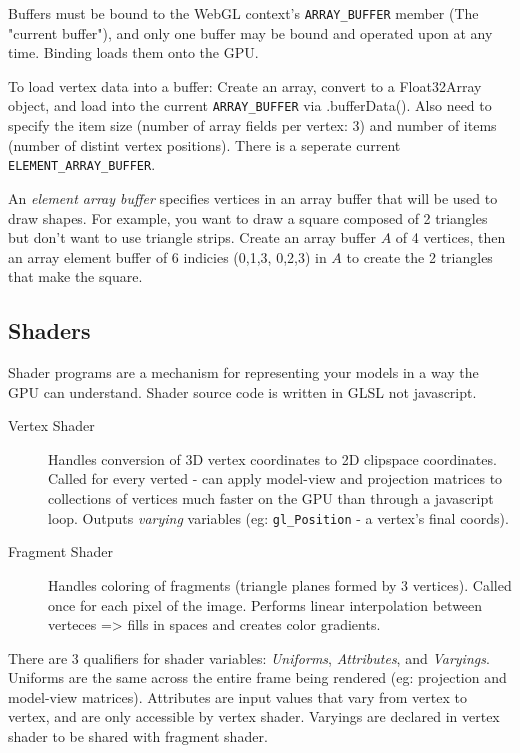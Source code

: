 \documentclass[12pt]{article}
\begin{document}
Buffers must be bound to the WebGL context's  \verb|ARRAY_BUFFER| member (The "current
buffer"), and only one buffer may be bound and operated upon at any time.
Binding loads them onto the GPU. 

To load vertex data into a buffer: Create an array, convert to a Float32Array
object, and load into the current  \verb|ARRAY_BUFFER| via .bufferData(). Also 
need to specify the item size (number of array fields per vertex: 3) and
number of items (number of distint vertex positions). There is a seperate
current  \verb|ELEMENT_ARRAY_BUFFER|.

An \emph{element array buffer} specifies vertices in an array buffer that will
be used to draw shapes. For example, you want to draw a square composed of 2
triangles but don't want to use triangle strips. Create an array buffer $A$ of 4 
vertices, then an array element buffer of 6 indicies (0,1,3, 0,2,3) in $A$ to 
create the 2 triangles that make the square. 

\subsection{Shaders}
Shader programs are a mechanism for representing your models in a way the GPU can
understand. Shader source code is written in GLSL not javascript.

\begin{description}	
	\item[Vertex Shader] Handles conversion of 3D vertex coordinates to 2D clipspace
		coordinates. Called for every verted - can apply model-view and projection 
		matrices to collections of vertices much faster on the GPU than through a javascript loop.
		Outputs \emph{varying} variables (eg:  \verb|gl_Position| - a vertex's final coords).
	\item[Fragment Shader] Handles coloring of fragments (triangle planes formed by
		3 vertices). Called once for each pixel of the image. Performs linear interpolation
		between verteces => fills in spaces and creates color gradients.
\end{description}

There are 3 qualifiers for shader variables: \emph{Uniforms}, \emph{Attributes}, and \emph{Varyings}. 
Uniforms are the same across the entire frame being rendered (eg: projection and model-view matrices). 
Attributes are input values that vary from vertex to vertex, and are only accessible by 
vertex shader. Varyings are declared in vertex shader to be shared with fragment shader.
\end{document}
